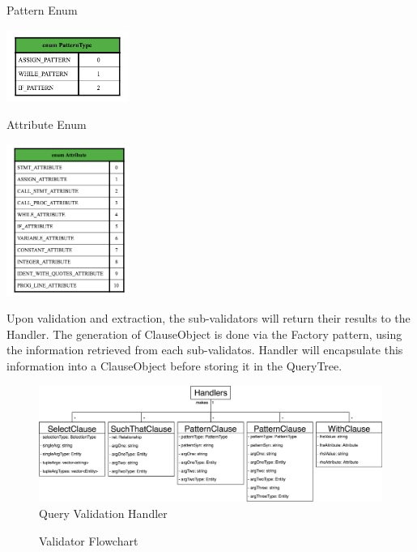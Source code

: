 \documentclass[12pt]{article}
\begin{document}
{{{{{{{{{{\begin{table}[htbp]
 \end{table}
\begin{table}[htbp]
  \caption{Pattern Enum}
 \includegraphics[width=0.3\textwidth]
{Pattern_Enum.png}
 \end{table}
\begin{table}[htbp]
  \caption{Attribute Enum}
 \includegraphics[width=0.3\textwidth]{Attribute_Enum.png}
\end{table}
\newline Upon validation and extraction, the sub-validators will return their results to the Handler. The generation of ClauseObject is done via the Factory pattern, using the information retrieved from each sub-validatos. Handler will encapsulate this information into a ClauseObject before storing it in the QueryTree.
\begin{figure}[htbp]
  \centering 
  \caption{Query Validation Handler}
 \includegraphics[width=1.0\textwidth]{ClauseInteraction.png}
\end{figure}
\begin{figure}[htbp]
  \centering 
  \caption{Validator Flowchart}

\end{figure}}}}}}}}}}}
\end{document}
